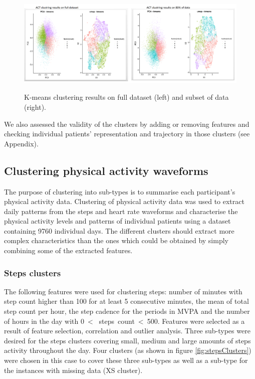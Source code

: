 \documentclass{article}
\begin{document}
\begin{figure}[!htb]
  \centering
  \caption{K-means clustering results on full dataset (left) and subset of data (right).}
  \includegraphics[]{ACTclusteringOn80.png}
  \label{fig:ACTclusteringon80}
\end{figure}
We also assessed the validity of the clusters by adding or removing features and checking individual patients’ representation and trajectory in those clusters (see Appendix).
\subsection{Clustering physical activity waveforms} 

The purpose of clustering into sub-types is to summarise each participant's physical activity data. Clustering of physical activity data was used to extract daily patterns from the steps and heart rate waveforms and characterise the physical activity levels and patterns of individual patients using a dataset containing 9760 individual days. The different clusters should extract more complex characteristics than the ones which could be obtained by simply combining some of the extracted features.

\subsubsection{Steps clusters}

The following features were used for clustering steps: number of minutes with step count higher than 100 for at least 5 consecutive minutes, the mean of total step count per hour, the step cadence for the periods in MVPA and the number of hours in the day with 0~< ~steps~count~<~500. Features were selected as a result of feature selection, correlation and outlier analysis. Three sub-types were desired for the steps clusters covering small, medium and large amounts of steps activity throughout the day. Four clusters (as shown in figure \ref{fig:stepsClusters}) were chosen in this case to cover these three sub-types as well as a sub-type for the instances with missing data (XS cluster). 
\end{document}
